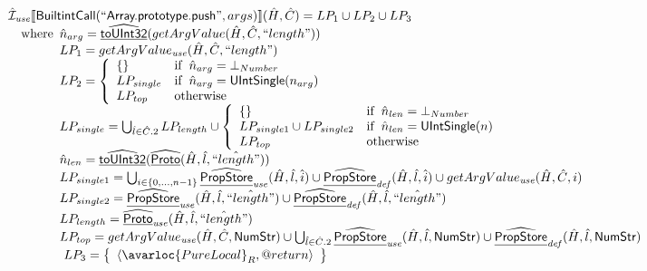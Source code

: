 \[\begin{array}{l}
\aI_{\it use}\lbr \SF{BuiltintCall}(``\SF{Array.prototype.push}",args)\rbr(\hat{H},\hat{C}) = LP_1 \cup LP_2 \cup LP_3\\
\quad\wherec{
  \hat{n}_{arg} = \ahf{toUInt32}(getArgValue(\hat{H},\hat{C}, ``length"))\\
  LP_1 = getArgValue_{\it use}(\hat{H},\hat{C}, ``length")\\
  LP_2 =  \left\{\begin{array}{ll}
      \set{} & \ifc{\hat{n}_{arg} = \bot_{Number}}\\
      LP_{single} & \ifc{\hat{n}_{arg} = \SF{UIntSingle}(n_{arg})}\\
      LP_{top} & \owc
    \end{array}\right.\\
  LP_{single} = \bigcup_{\hat{l} \in \hat{C}.2}  LP_{length} \cup \left\{\begin{array}{ll}
      \set{} & \ifc{\hat{n}_{len} = \bot_{Number}}\\
      LP_{single1} \cup LP_{single2} & \ifc{\hat{n}_{len} = \SF{UIntSingle}(n)}\\
      LP_{top} & \owc
    \end{array}\right.\\
  \hat{n}_{len} = \ahf{toUInt32}(\ahf{Proto}(\hat{H}, \hat{l}, \hat{``length"}))\\
  LP_{single1} = \bigcup_{i \in \{0,...,n-1\}} \ahf{PropStore}_{\it use}(\hat{H}, \hat{l}, \hat{i}) \cup \ahf{PropStore}_{\it def}(\hat{H}, \hat{l}, \hat{i}) \cup getArgValue_{\it use}(\hat{H},\hat{C}, i)\\
  LP_{single2} = \ahf{PropStore}_{\it use}(\hat{H}, \hat{l}, \hat{``length"}) \cup \ahf{PropStore}_{\it def}(\hat{H}, \hat{l}, \hat{``length"})\\
  LP_{length} = \ahf{Proto}_{\it use}(\hat{H}, \hat{l}, \hat{``length"})\\
  LP_{top} = getArgValue_{\it use}(\hat{H},\hat{C}, \SF{NumStr})
    \cup \bigcup_{\hat{l} \in \hat{C}.2} \ahf{PropStore}_{\it use}(\hat{H}, \hat{l}, \SF{NumStr}) \cup  \ahf{PropStore}_{\it def}(\hat{H}, \hat{l}, \SF{NumStr})\\\
  LP_3 = \set{\langle\avarloc{PureLocal}_R,\varprop{return}\rangle}\\
  }\\
\\



\end{array}\]
